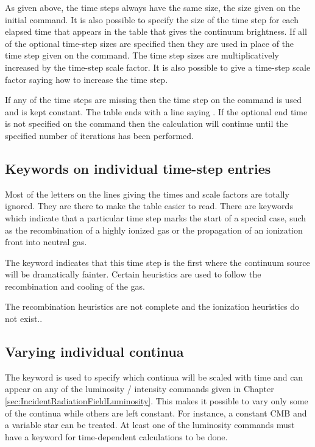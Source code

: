 \begin{shaded}
As given above, the time steps always have the same size, the size given
on the initial  command.
It is also possible to specify the size
of the time step for each elapsed time that appears in the
table that gives the continuum brightness.
If all of the optional time-step sizes are
specified then they are used in place of the time step given on the
 command.
The time step sizes are multiplicatively increased by the time-step
scale factor.
It is also possible to give a time-step scale factor saying
how to increase the time step.

If any of the time steps are missing then the time step on the command is used and is kept
constant.
The table ends with a line saying .
If the optional end
time is not specified on the  command
then the calculation will continue
until the specified number of iterations has been performed.

\subsection{Keywords on individual time-step entries}

Most of the letters on the lines giving the times and scale factors are
totally ignored.  They are there to make the table easier to read.  There
are keywords which indicate that a particular time step marks the start
of a special case, such as the recombination of a highly ionized gas or
the propagation of an ionization front into neutral gas.

The keyword  indicates that
this time step is the first
where the continuum source will be dramatically fainter.
Certain heuristics
are used to follow the recombination and cooling of the gas.

The recombination heuristics are not complete
and the ionization heuristics do not exist..

\subsection{Varying individual continua}

The keyword  is used to specify which continua
will be scaled with
time and can appear on any of the luminosity / intensity commands given
in Chapter \ref{sec:IncidentRadiationFieldLuminosity}.
This makes it possible to vary only some of the continua
while others are left constant.
For instance, a constant CMB and a variable
star can be treated.
At least one of the luminosity commands must have
a  keyword for time-dependent calculations to be done.


\end{shaded}

